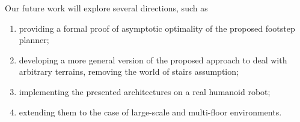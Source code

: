 
Our future work will explore several directions, such as
\begin{enumerate}
    \item providing a formal proof of asymptotic optimality of the proposed
        footstep planner;
    \item developing a more general version of the proposed approach to deal
        with arbitrary terrains, removing the world of stairs assumption;
    \item implementing the presented architectures on a real humanoid robot;
    \item extending them to the case of large-scale and multi-floor environments.
\end{enumerate}
